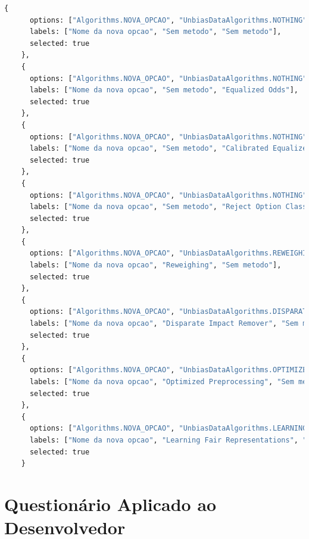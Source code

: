 \documentclass[portugues]{ic-tese}
\begin{document}
\begin{lstlisting}[language=Python, label=cod:AddPlanningConfig]
    {
      options: ["Algorithms.NOVA_OPCAO", "UnbiasDataAlgorithms.NOTHING", "UnbiasPostProcAlgorithms.NOTHING"],
      labels: ["Nome da nova opcao", "Sem metodo", "Sem metodo"],
      selected: true
    },
    {
      options: ["Algorithms.NOVA_OPCAO", "UnbiasDataAlgorithms.NOTHING", "UnbiasPostProcAlgorithms.EQUALIZED_ODDS"],
      labels: ["Nome da nova opcao", "Sem metodo", "Equalized Odds"],
      selected: true
    },
    {
      options: ["Algorithms.NOVA_OPCAO", "UnbiasDataAlgorithms.NOTHING", "UnbiasPostProcAlgorithms.CALIBRATED_EQUALIZED_ODDS"],
      labels: ["Nome da nova opcao", "Sem metodo", "Calibrated Equalized Odds"],
      selected: true
    },
    {
      options: ["Algorithms.NOVA_OPCAO", "UnbiasDataAlgorithms.NOTHING", "UnbiasPostProcAlgorithms.REJECT_OPTION_CLASSIFICATION"],
      labels: ["Nome da nova opcao", "Sem metodo", "Reject Option Classification"],
      selected: true
    },
    {
      options: ["Algorithms.NOVA_OPCAO", "UnbiasDataAlgorithms.REWEIGHING", "UnbiasPostProcAlgorithms.NOTHING"],
      labels: ["Nome da nova opcao", "Reweighing", "Sem metodo"],
      selected: true
    },
    {
      options: ["Algorithms.NOVA_OPCAO", "UnbiasDataAlgorithms.DISPARATE_IMPACT_REMOVER", "UnbiasPostProcAlgorithms.NOTHING"],
      labels: ["Nome da nova opcao", "Disparate Impact Remover", "Sem metodo"],
      selected: true
    },
    {
      options: ["Algorithms.NOVA_OPCAO", "UnbiasDataAlgorithms.OPTIMIZED_PREPROCESSING", "UnbiasPostProcAlgorithms.NOTHING"],
      labels: ["Nome da nova opcao", "Optimized Preprocessing", "Sem metodo"],
      selected: true
    },
    {
      options: ["Algorithms.NOVA_OPCAO", "UnbiasDataAlgorithms.LEARNING_FAIR_REPRESENTATIONS", "UnbiasPostProcAlgorithms.NOTHING"],
      labels: ["Nome da nova opcao", "Learning Fair Representations", "Sem metodo"],
      selected: true
    }
\end{lstlisting}

\chapter{Questionário Aplicado ao Desenvolvedor}
\label{ann:Questionary}
\end{document}

